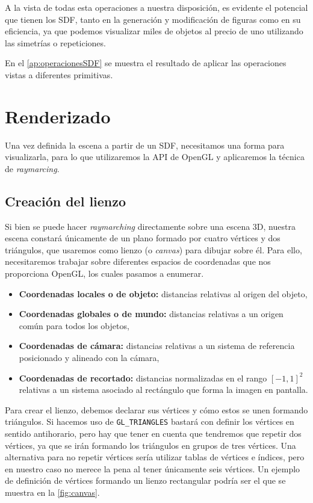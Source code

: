 A la vista de todas esta operaciones a nuestra disposición, es evidente el potencial que tienen los SDF, tanto en la generación y modificación de figuras como en su eficiencia, ya que podemos visualizar miles de objetos al precio de uno utilizando las simetrías o repeticiones.\newline

En el \autoref{ap:operacionesSDF} se muestra el resultado de aplicar las operaciones vistas a diferentes primitivas.

\section{Renderizado}
Una vez definida la escena a partir de un SDF, necesitamos una forma para visualizarla, para lo que utilizaremos la API de OpenGL \cite{opengl} y aplicaremos la técnica de \textit{raymarcing}. 

\subsection{Creación del lienzo}
Si bien se puede hacer \textit{raymarching} directamente sobre una escena 3D, nuestra escena constará únicamente de un plano formado por cuatro vértices y dos triángulos, que usaremos como lienzo  (o \textit{canvas}) para dibujar sobre él. Para ello, necesitaremos trabajar sobre diferentes espacios de coordenadas que nos proporciona OpenGL, los cuales pasamos a enumerar.
\begin{itemize}
    \item \textbf{Coordenadas locales o de objeto:} distancias relativas al origen del objeto,
    \item \textbf{Coordenadas globales o de mundo:} distancias relativas a un origen común para todos los objetos,
    \item \textbf{Coordenadas de cámara:} distancias relativas a un sistema de referencia posicionado y alineado con la cámara,
    \item \textbf{Coordenadas de recortado:} distancias normalizadas en el rango $[-1,1]^2$ relativas a un sistema asociado al rectángulo que forma la imagen en pantalla.
\end{itemize}

Para crear el lienzo, debemos declarar sus vértices y cómo estos se unen formando triángulos. Si hacemos uso de \texttt{GL\_TRIANGLES} bastará con definir los vértices en sentido antihorario, pero hay que tener en cuenta que tendremos que repetir dos vértices, ya que se irán formando los triángulos en grupos de tres vértices. Una alternativa para no repetir vértices sería utilizar tablas de vértices e índices, pero en nuestro caso no merece la pena al tener únicamente seis vértices. Un ejemplo de definición de vértices formando un lienzo rectangular podría ser el que se muestra en la \autoref{fig:canvas}.

